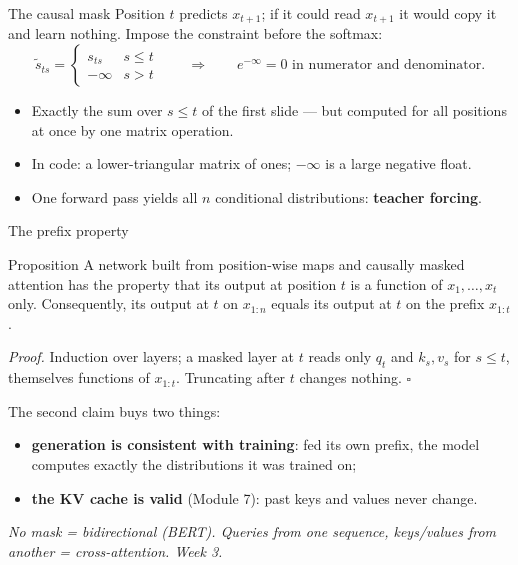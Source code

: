 \documentclass[11pt,aspectratio=169]{beamer}
\newcommand{\dest}[1]{\textcolor{structure}{\textbf{#1}}}
\newcommand{\hook}[1]{{\small\textcolor{gray!60!black}{\textit{#1}}}}
\begin{document}
\begin{frame}{The causal mask}
  Position $t$ predicts $x_{t+1}$; if it could read $x_{t+1}$ it would copy it and learn
  nothing. Impose the constraint before the softmax:
  \[
    \tilde s_{ts} = \begin{cases} s_{ts} & s\le t\\ -\infty & s > t\end{cases}
    \qquad\Longrightarrow\qquad e^{-\infty} = 0 \text{ in numerator and denominator.}
  \]

  \vspace{0.6em}
  \begin{itemize}
    \item Exactly the sum over $s\le t$ of the first slide --- but computed for all positions
          at once by one matrix operation.
    \item In code: a lower-triangular matrix of ones; $-\infty$ is a large negative float.
    \item One forward pass yields all $n$ conditional distributions: \dest{teacher forcing}.
  \end{itemize}
\end{frame}

\begin{frame}{The prefix property}
  \begin{block}{Proposition}
    A network built from position-wise maps and causally masked attention has the property
    that its output at position $t$ is a function of $x_1,\dots,x_t$ only. Consequently,
    its output at $t$ on $x_{1:n}$ equals its output at $t$ on the prefix $x_{1:t}$.
  \end{block}

  \vspace{0.5em}
  \emph{Proof.} Induction over layers; a masked layer at $t$ reads only $q_t$ and
  $k_s, v_s$ for $s\le t$, themselves functions of $x_{1:t}$. Truncating after $t$ changes
  nothing. $\square$

  \vspace{0.8em}
  The second claim buys two things:
  \begin{itemize}
    \item \textbf{generation is consistent with training}: fed its own prefix, the model
          computes exactly the distributions it was trained on;
    \item \textbf{the KV cache is valid} (Module 7): past keys and values never change.
  \end{itemize}

  \vspace{0.3em}
  \hook{No mask = bidirectional (BERT). Queries from one sequence, keys/values from another
  = cross-attention. Week 3.}
\end{frame}
\end{document}
